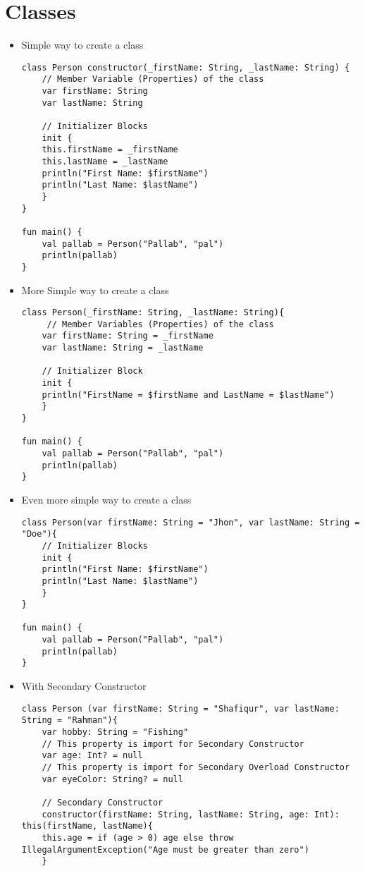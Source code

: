 \documentclass[11pt]{article}
\begin{document}
\section*{Classes}
\label{sec:org738cbd2}
\begin{itemize}
\item Simple way to create a class
\begin{verbatim}
class Person constructor(_firstName: String, _lastName: String) {
    // Member Variable (Properties) of the class
    var firstName: String
    var lastName: String

    // Initializer Blocks
    init {
	this.firstName = _firstName
	this.lastName = _lastName
	println("First Name: $firstName")
	println("Last Name: $lastName")
    }
}

fun main() {
    val pallab = Person("Pallab", "pal")
    println(pallab)
}
\end{verbatim}
\item More Simple way to create a class
\begin{verbatim}
class Person(_firstName: String, _lastName: String){
     // Member Variables (Properties) of the class
    var firstName: String = _firstName
    var lastName: String = _lastName

    // Initializer Block
    init {
	println("FirstName = $firstName and LastName = $lastName")
    }
}

fun main() {
    val pallab = Person("Pallab", "pal")
    println(pallab)
}
\end{verbatim}
\item Even more simple way to create a class
\begin{verbatim}
class Person(var firstName: String = "Jhon", var lastName: String = "Doe"){
    // Initializer Blocks
    init {
	println("First Name: $firstName")
	println("Last Name: $lastName")
    }
}

fun main() {
    val pallab = Person("Pallab", "pal")
    println(pallab)
}
\end{verbatim}
\item With Secondary Constructor
\begin{verbatim}
class Person (var firstName: String = "Shafiqur", var lastName: String = "Rahman"){
    var hobby: String = "Fishing"
    // This property is import for Secondary Constructor
    var age: Int? = null
    // This property is import for Secondary Overload Constructor
    var eyeColor: String? = null

    // Secondary Constructor
    constructor(firstName: String, lastName: String, age: Int): this(firstName, lastName){
	this.age = if (age > 0) age else throw IllegalArgumentException("Age must be greater than zero")
    }


\end{verbatim}
\end{itemize}
\end{document}

